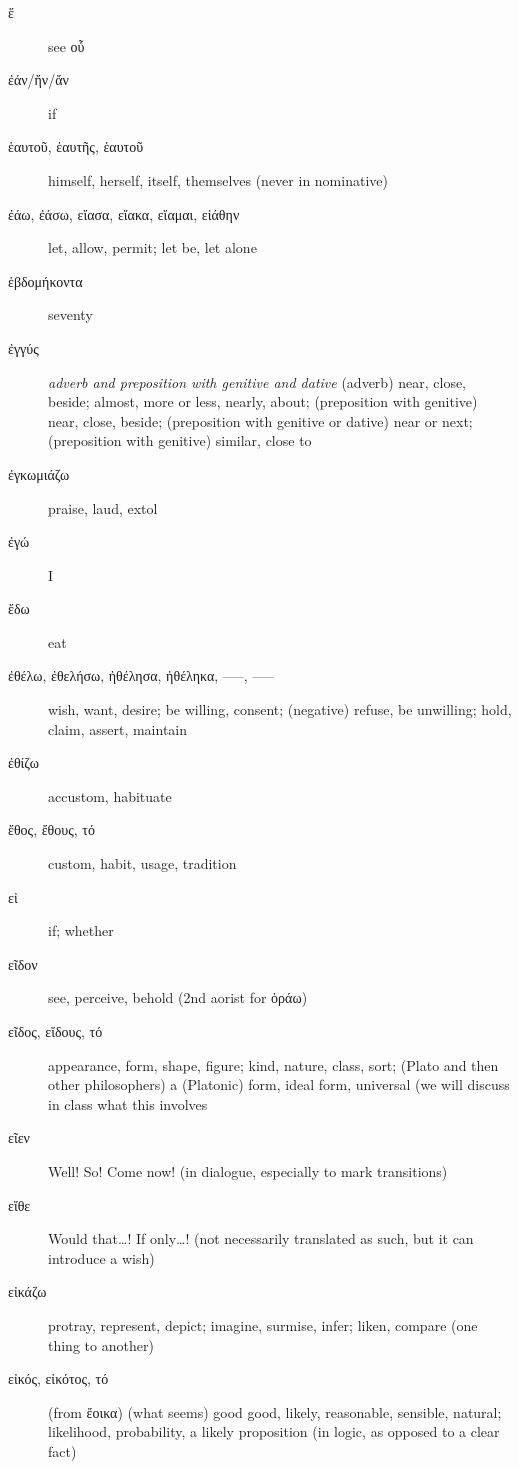 \documentclass[12pt,letterpaper]{article}
\begin{document}
\begin{description}
    \item[\textgreek{ἕ}] \marginnote{*}see οὗ
    \item[\textgreek{ἐάν/ἤν/ἄν}] \marginnote{*}if
    \item[\textgreek{ἑαυτοῦ, ἑαυτῆς, ἑαυτοῦ}] \marginnote{*}himself, herself, itself, themselves (never in nominative)
    \item[\textgreek{ἐάω, ἐάσω, εἴασα, εἴακα, εἴαμαι, εἰάθην}] \marginnote{*}let, allow, permit; let be, let alone
    \item[\textgreek{ἑβδομήκοντα}] seventy
    \item[\textgreek{ἐγγύς}] \textit{adverb and preposition with genitive and dative} (adverb) near, close, beside; almost, more or less, nearly, about; (preposition with genitive) near, close, beside; (preposition with genitive or dative) near or next; (preposition with genitive) similar, close to
    \item[\textgreek{ἐγκωμιάζω}] praise, laud, extol
    \item[\textgreek{ἐγώ}] \marginnote{*}I
    \item[\textgreek{ἔδω}] eat
    \item[\textgreek{ἐθέλω, ἐθελήσω, ἠθέλησα, ἠθέληκα, –––, –––}] \marginnote{*}wish, want, desire; be willing, consent; (negative) refuse, be unwilling; hold, claim, assert, maintain
    \item[\textgreek{ἐθίζω}] accustom, habituate
    \item[\textgreek{ἔθος, ἔθους, τό}] custom, habit, usage, tradition
    \item[\textgreek{εἰ}] \marginnote{*}if; whether
    \item[\textgreek{εῖδον}] \marginnote{*}see, perceive, behold (2nd aorist for \textgreek{ὁράω})
    \item[\textgreek{εῖδος, εἴδους, τό}] appearance, form, shape, figure; kind, nature, class, sort; (Plato and then other philosophers) a (Platonic) form, ideal form, universal (we will discuss in class what this involves
    \item[\textgreek{εῖεν}] Well! So! Come now! (in dialogue, especially to mark transitions)
    \item[\textgreek{εἴθε}] Would that\dots ! If only\dots ! (not necessarily translated as such, but it can introduce a wish)
    \item[\textgreek{εἰκάζω}] protray, represent, depict; imagine, surmise, infer; liken, compare (one thing to another)
    \item[\textgreek{εἰκός, εἰκότος, τό}] \marginnote{*}(from \textgreek{ἔοικα}) (what seems) good good, likely, reasonable, sensible, natural; likelihood, probability, a likely proposition (in logic, as opposed to a clear fact)

\end{description}
\end{document}
